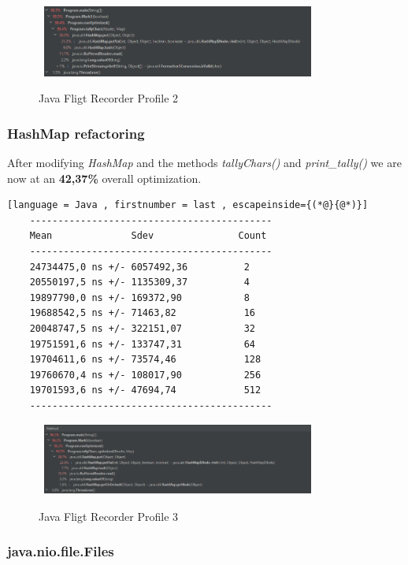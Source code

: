 \begin{figure}[H]
    \centering\
    \includegraphics[width = 0.8\textwidth ]{figures/profile2.PNG}
    \caption{Java Fligt Recorder Profile 2}
    \label{fig:p2}
\end{figure}

\subsubsection{HashMap refactoring}
\label{sec:2.6.2}
After modifying \emph{HashMap} and the methods \emph{tallyChars()} and \emph{print\_tally()} we are now at an \textbf{42,37\%} overall optimization.
\begin{lstlisting}[language = Java , firstnumber = last , escapeinside={(*@}{@*)}]
    -------------------------------------------
    Mean              Sdev               Count
    -------------------------------------------
    24734475,0 ns +/- 6057492,36          2
    20550197,5 ns +/- 1135309,37          4
    19897790,0 ns +/- 169372,90           8
    19688542,5 ns +/- 71463,82            16
    20048747,5 ns +/- 322151,07           32
    19751591,6 ns +/- 133747,31           64
    19704611,6 ns +/- 73574,46            128
    19760670,4 ns +/- 108017,90           256
    19701593,6 ns +/- 47694,74            512
    -------------------------------------------
\end{lstlisting}

\begin{figure}[H]
    \centering\
    \includegraphics[width = 0.8\textwidth ]{figures/profile3.PNG}
    \caption{Java Fligt Recorder Profile 3}
    \label{fig:p3}
\end{figure}

\subsubsection{java.nio.file.Files}
\label{sec:2.6.3}

